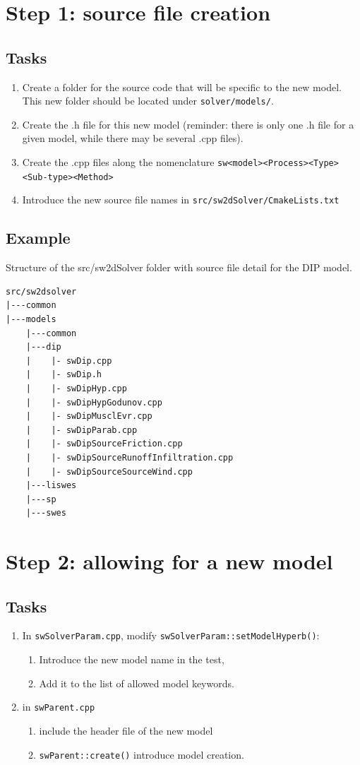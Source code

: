 %
%
%
%
\section{Step 1: source file creation}
%
%
\subsection{Tasks}
\begin{enumerate}
\item Create a folder for the source code that will be specific to the new model. This new folder should be located under \texttt{solver/models/}.
\item Create the .h file for this new model (reminder: there is only one .h file for a given model, while there may be several .cpp files).
\item Create the .cpp files along the nomenclature \texttt{sw<model><Process><Type><Sub-type><Method>}
\item Introduce the new source file names in \texttt{src/sw2dSolver/CmakeLists.txt}
\end{enumerate}
%
%
\subsection{Example}
Structure of the src/sw2dSolver folder with source file detail for the DIP model.
\begin{lstlisting}
src/sw2dsolver
|---common
|---models
    |---common
    |---dip
    |    |- swDip.cpp
    |    |- swDip.h
    |    |- swDipHyp.cpp
    |    |- swDipHypGodunov.cpp
    |    |- swDipMusclEvr.cpp
    |    |- swDipParab.cpp
    |    |- swDipSourceFriction.cpp
    |    |- swDipSourceRunoffInfiltration.cpp
    |    |- swDipSourceSourceWind.cpp
    |---liswes
    |---sp
    |---swes
\end{lstlisting}
%
%
%
\section{Step 2: allowing for a new model}
%
%
%
\subsection{Tasks}
\begin{enumerate}
\item In \texttt{swSolverParam.cpp}, modify \texttt{swSolverParam::setModelHyperb()}:
\begin{enumerate}
	\item Introduce the new model name in the test, 
	\item Add it to the list of allowed model keywords.
\end{enumerate}
\item in \texttt{swParent.cpp}
\begin{enumerate}
\item include the header file of the new model
\item  \texttt{swParent::create()} introduce model creation.
\end{enumerate}
\end{enumerate}
%
%
%
